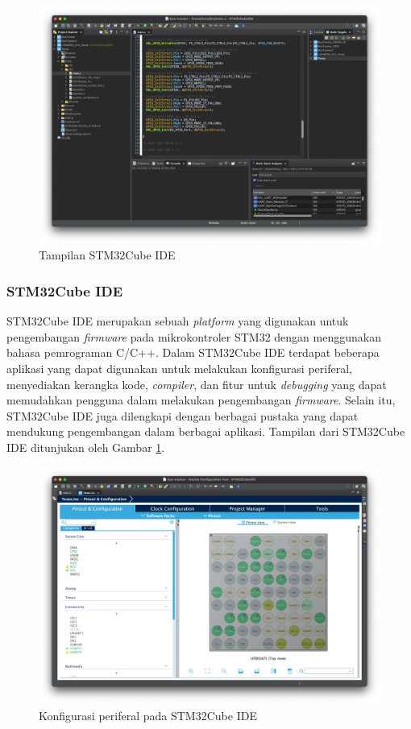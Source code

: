 \begin{figure}[H]
	\centering
	\includegraphics[width=12cm]{contents/chapter-2/stm32-ide.png}
	\caption{Tampilan STM32Cube IDE}
	\label{Fig: stm32-ide}
\end{figure}

\subsubsection{STM32Cube IDE}

STM32Cube IDE merupakan sebuah \textit{platform} yang digunakan untuk pengembangan \textit{firmware} pada mikrokontroler STM32 dengan menggunakan bahasa pemrograman C/C++. Dalam STM32Cube IDE terdapat beberapa aplikasi yang dapat digunakan untuk melakukan konfigurasi periferal, menyediakan kerangka kode, \textit{compiler}, dan fitur untuk \textit{debugging} yang dapat memudahkan pengguna dalam melakukan pengembangan \textit{firmware}. Selain itu, STM32Cube IDE juga dilengkapi dengan berbagai pustaka yang dapat mendukung pengembangan dalam berbagai aplikasi. Tampilan dari STM32Cube IDE ditunjukan oleh Gambar \ref{Fig: stm32-ide}.

\begin{figure}[H]
	\centering
	\includegraphics[width=12cm]{contents/chapter-2/stm32-mx.png}
	\caption{Konfigurasi periferal pada STM32Cube IDE}
	\label{Fig: stm32-mx}
\end{figure}

